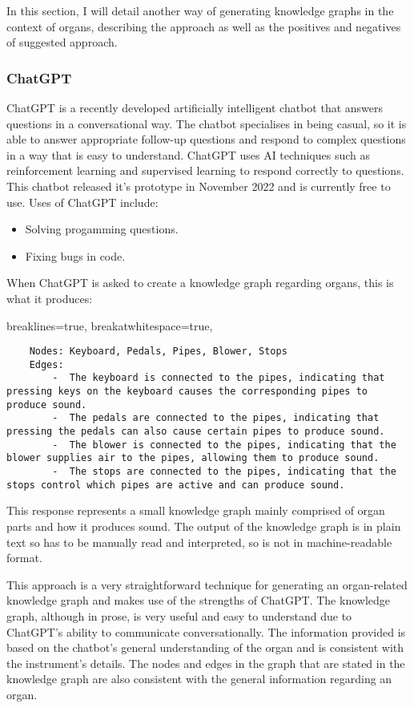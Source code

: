 \hspace{0.5cm} In this section, I will detail another way of generating knowledge graphs in the context of organs, describing  the approach as well as the positives and negatives of suggested approach.

\subsubsection{ChatGPT}
\hspace{0.5cm} ChatGPT is a recently developed artificially intelligent chatbot that answers questions in a conversational way. The chatbot specialises in being casual, so it is able to answer appropriate follow-up questions and respond to complex questions in a way that is easy to understand. ChatGPT uses AI techniques such as reinforcement learning and supervised learning to respond correctly to questions. \cite{chatgptwiki} This chatbot released it's prototype in November 2022 and is currently free to use. Uses of ChatGPT include:
\begin{itemize}
\item Solving progamming questions.
\item Fixing bugs in code.
\end{itemize}

When ChatGPT is asked to create a knowledge graph regarding organs, this is what it produces:

\lstset
{
    breaklines=true,
    breakatwhitespace=true,
}
\begin{lstlisting}
    Nodes: Keyboard, Pedals, Pipes, Blower, Stops
    Edges:
        -  The keyboard is connected to the pipes, indicating that pressing keys on the keyboard causes the corresponding pipes to produce sound.
        -  The pedals are connected to the pipes, indicating that pressing the pedals can also cause certain pipes to produce sound.
        -  The blower is connected to the pipes, indicating that the blower supplies air to the pipes, allowing them to produce sound.
        -  The stops are connected to the pipes, indicating that the stops control which pipes are active and can produce sound.
\end{lstlisting}

This response represents a small knowledge graph mainly comprised of organ parts and how it produces sound. The output of the knowledge graph is in plain text so has to be manually read and interpreted, so is not in machine-readable format. 

This approach is a very straightforward technique for generating an organ-related knowledge graph and makes use of the strengths of ChatGPT. The knowledge graph, although in prose, is very useful and easy to understand due to ChatGPT's ability to communicate conversationally. The information provided is based on the chatbot's general understanding of the organ and is consistent with the instrument's details. The nodes and edges in the graph that are stated in the knowledge graph are also consistent with the general information regarding an organ. 

